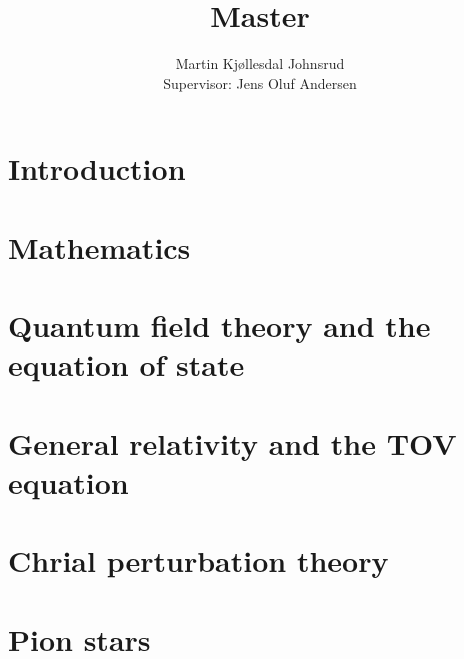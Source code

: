\documentclass{book}
\title{\huge{Master}}
\author{
    \large{Martin Kjøllesdal Johnsrud }\\
    \normalsize{Supervisor: Jens Oluf Andersen}
    }
\begin{document}
    \maketitle
    \listoftodos
    \clearpage
    \tableofcontents
   
    \setlength{\parindent}{0em}
    \setlength{\parskip}{0.8em}

    \chapter{Introduction}
    \label{chapter: introduction}
    


    \chapter{Mathematics}
    \label{chapter: math}
    
    


    \chapter{Quantum field theory and the equation of state}
    \label{chapter: QFT}
    
    
    
    

    \chapter{General relativity and the TOV equation}
    \label{chapter: GR}
    
    
    

    \chapter{Chrial perturbation theory}
    \label{chapter: chpt}
    

    \chapter{Pion stars}
    \label{chapter: pion stars}
    


    \appendix

    \chapter[Appendix A]{}
    
\end{document}
